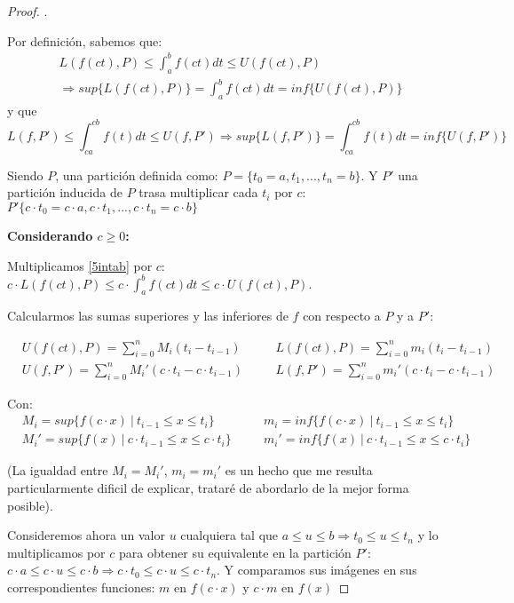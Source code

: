 \documentclass[12pt]{article}
\begin{document}
\begin{proof}
    . \medskip

    Por definici\'on, sabemos que:
    \begin{multline}
        \label{5intab}
        L(f(ct),P)\leq\int_{a}^{b}f(ct)dt\leq U(f(ct),P) \\ \Longrightarrow sup\{L(f(ct),P)\}=\int_{a}^{b}f(ct)dt=inf\{U(f(ct),P)\}
    \end{multline}
    y que
    \begin{equation}
        \label{5intcacb}
        L(f,P')\leq\int_{ca}^{cb}f(t)dt\leq U(f,P') \Longrightarrow sup\{L(f,P')\}=\int_{ca}^{cb}f(t)dt=inf\{U(f,P')\}
    \end{equation}

    Siendo $P$, una partici\'on definida como: \(P=\{t_0=a,t_1,...,t_n=b\}\). Y $P'$ una partici\'on inducida de $P$ trasa multiplicar cada $t_i$ por $c$: \(P'\{c\cdot t_0=c\cdot a,c\cdot t_1,...,c\cdot t_n=c\cdot b\}\)\bigskip

    \textbf{Considerando $c\geq0$:}\bigskip

    Multiplicamos \eqref{5intab} por $c$: \quad \(c\cdot L(f(ct),P)\leq c\cdot\int_{a}^{b}f(ct)dt\leq c\cdot U(f(ct),P)\).\bigskip

    Calcularmos las sumas superiores y las inferiores de $f$ con respecto a $P$ y a $P'$:

    \begin{align*}
        &U(f(ct),P)=\sum_{i=0}^n M_i(t_i-t_{i-1}) \quad &&L(f(ct),P)=\sum_{i=0}^n m_i(t_i-t_{i-1})\\
        &U(f,P')=\sum_{i=0}^n M_i'(c\cdot t_i-c\cdot t_{i-1}) \quad &&L(f,P')=\sum_{i=0}^n m_i'(c\cdot t_i-c\cdot t_{i-1})
    \end{align*}

    Con:
    \begin{align*}
        &M_i=sup\{f(c\cdot x) \ | \ t_{i-1}\leq x\leq t_i\} \quad &&m_i=inf\{f(c\cdot x) \ | \ t_{i-1}\leq x\leq t_i\}\\
        &M_i'=sup\{f(x) \ | \ c\cdot t_{i-1}\leq x\leq c\cdot t_i\} \quad &&m_i'=inf\{f(x) \ | \ c\cdot t_{i-1}\leq x\leq c\cdot t_i\}
    \end{align*}

    (La igualdad entre $M_i=M_i'$, $m_i=m_i'$ es un hecho que me resulta particularmente dificil de explicar, tratar\'e de abordarlo de la mejor forma posible).\bigskip

    Consideremos ahora un valor $u$ cualquiera tal que \(a\leq u\leq b \Longrightarrow t_{0}\leq u\leq t_n\) y lo multiplicamos por $c$ para obtener su equivalente en la partici\'on $P'$: \(c\cdot a\leq c\cdot u\leq c\cdot b \Longrightarrow c\cdot t_{0}\leq c\cdot u\leq c\cdot t_n\).\bigskip
    Y comparamos sus im\'agenes en sus correspondientes funciones: $m$ en \(f(c\cdot x)\) y $c\cdot m$ en \(f(x)\)


\end{proof}
\end{document}
